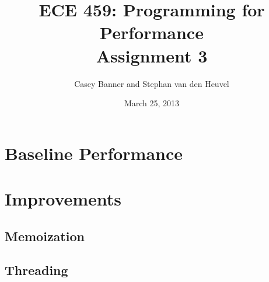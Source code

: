 \documentclass[12pt]{article}
\title{ECE 459: Programming for Performance\\Assignment 3}
\author{Casey Banner and Stephan van den Heuvel}
\date{March 25, 2013}
\begin{document}
\maketitle

\section*{Baseline Performance}



\section*{Improvements}

\subsection*{Memoization}

\subsection*{Threading}
\end{document}
